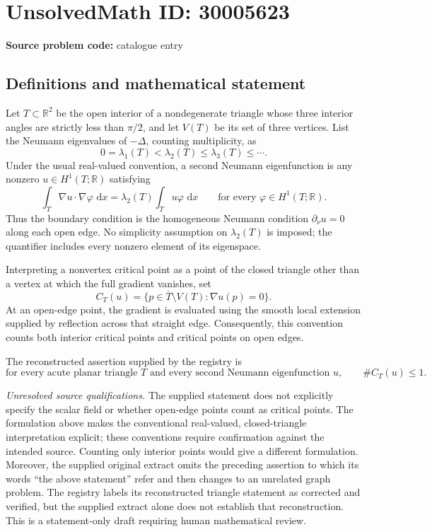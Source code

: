 \documentclass[11pt]{article}
\newcommand{\R}{\mathbb{R}}
\newcommand{\dd}{\,\mathrm{d}}
\begin{document}
\section*{UnsolvedMath ID: 30005623}
\textbf{Source problem code:} catalogue entry
\subsection{Definitions and mathematical statement}
Let \(T\subset\R^2\) be the open interior of a nondegenerate triangle whose three interior angles are strictly less than \(\pi/2\), and let \(V(T)\) be its set of three vertices. List the Neumann eigenvalues of \(-\Delta\), counting multiplicity, as
\[
0=\lambda_1(T)<\lambda_2(T)\leq\lambda_3(T)\leq\cdots.
\]
Under the usual real-valued convention, a second Neumann eigenfunction is any nonzero \(u\in H^1(T;\R)\) satisfying
\[
\int_T\nabla u\cdot\nabla\varphi\,\dd x
=\lambda_2(T)\int_Tu\varphi\,\dd x
\qquad\text{for every }\varphi\in H^1(T;\R).
\]
Thus the boundary condition is the homogeneous Neumann condition \(\partial_\nu u=0\) along each open edge. No simplicity assumption on \(\lambda_2(T)\) is imposed; the quantifier includes every nonzero element of its eigenspace.

Interpreting a nonvertex critical point as a point of the closed triangle other than a vertex at which the full gradient vanishes, set
\[
C_T(u)=\{p\in\overline T\setminus V(T):\nabla u(p)=0\}.
\]
At an open-edge point, the gradient is evaluated using the smooth local extension supplied by reflection across that straight edge. Consequently, this convention counts both interior critical points and critical points on open edges.

The reconstructed assertion supplied by the registry is
\[
\text{for every acute planar triangle }T\text{ and every second Neumann eigenfunction }u,
\qquad \#C_T(u)\leq 1.
\]

\emph{Unresolved source qualifications.} The supplied statement does not explicitly specify the scalar field or whether open-edge points count as critical points. The formulation above makes the conventional real-valued, closed-triangle interpretation explicit; these conventions require confirmation against the intended source. Counting only interior points would give a different formulation. Moreover, the supplied original extract omits the preceding assertion to which its words ``the above statement'' refer and then changes to an unrelated graph problem. The registry labels its reconstructed triangle statement as corrected and verified, but the supplied extract alone does not establish that reconstruction. This is a statement-only draft requiring human mathematical review.
\end{document}
